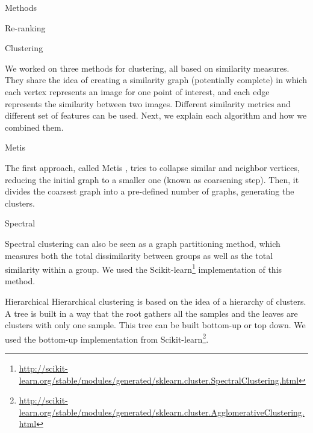 \documentclass{acm_proc_article-me}
\begin{document}
\begin{section}{Methods}
\begin{subsection}{Re-ranking}
\end{subsection}


\begin{subsection}{Clustering}

We worked on three methods for clustering, all based on similarity measures.
They share the idea of creating a similarity graph (potentially complete) in which each vertex represents an image for one point of interest, and
each edge represents the similarity between two images. Different similarity metrics and different set of features can be used.
Next, we explain each algorithm and how we combined them.


\begin{subsubsection}{Metis}

The first approach, called Metis \cite{metis},
tries to collapse similar and neighbor vertices, reducing the initial graph to a smaller one (known as coarsening step).
Then, it divides the coarsest graph into a pre-defined number of graphs, generating the clusters.  

\end{subsubsection}

\begin{subsubsection}{Spectral}

Spectral clustering \cite{spectral} can also be seen as a graph partitioning method, which measures both the total dissimilarity between groups 
as well as the total similarity within a group. We used the Scikit-learn\footnote{\url{http://scikit-learn.org/stable/modules/generated/sklearn.cluster.SpectralClustering.html}} implementation of this method. 

\end{subsubsection}

\begin{subsubsection}{Hierarchical}
Hierarchical clustering \cite{hierarchical} is based on the idea of a hierarchy of clusters. A tree is built in a way that the root gathers all the samples and the leaves are clusters with only one sample. This tree can be built bottom-up or top down. We used the bottom-up implementation from Scikit-learn\footnote{\url{http://scikit-learn.org/stable/modules/generated/sklearn.cluster.AgglomerativeClustering.html}}.


\end{subsubsection}
\end{subsection}
\end{section}
\end{document}
